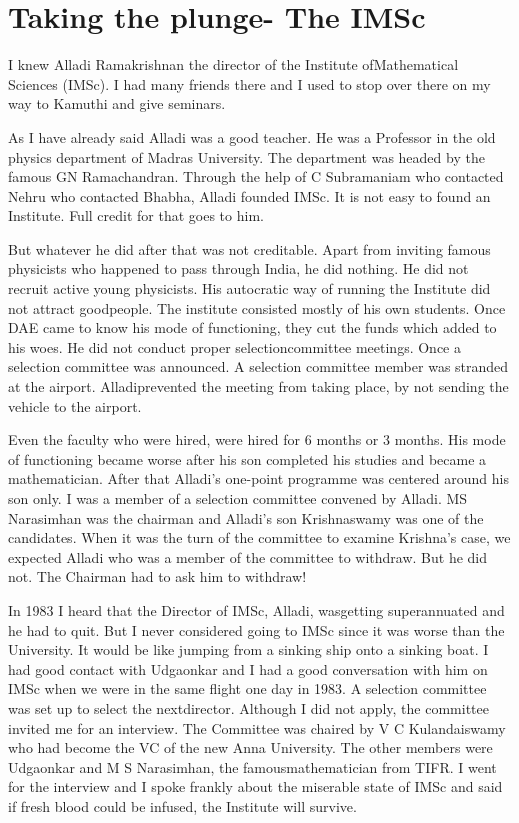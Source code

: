 \chapter{Taking the plunge- The IMSc}

I knew Alladi Ramakrishnan the director of the Institute of\break Mathematical 
Sciences (IMSc). I had many friends there and I used to stop over there 
on my way to Kamuthi and give seminars.


As I have already said Alladi was a good teacher. He was a Professor in 
the old physics department of Madras University. The department was 
headed by the famous GN Ramachandran. Through the help of C Subramaniam 
who contacted Nehru who contacted Bhabha, Alladi founded IMSc. It is not 
easy to found an Institute. Full credit for that goes to him.


But whatever he did after that was not creditable. Apart from inviting 
famous physicists who happened to pass through India, he did nothing. He 
did not recruit active young physicists. His autocratic way of running 
the Institute did not attract good\break people. The institute consisted 
mostly of his own students. Once DAE came to know his mode of 
functioning, they cut the funds which added to his woes. He did not 
conduct proper selection\break committee meetings. Once a selection committee 
was announced. A selection committee member was stranded at the airport. 
Alladi\break prevented the meeting from taking place, by not sending the\break 
vehicle to the airport.

Even the faculty who were hired, were hired for 6 months or 3 months. 
His mode of functioning became worse after his son completed his studies 
and became a mathematician. After that Alladi's one-point programme was 
centered around his son only. I was a member of a selection committee 
convened by Alladi. MS Narasimhan was the chairman and Alladi's son 
Krishnaswamy was one of the candidates. When it was the turn of the 
committee to examine Krishna's case, we expected Alladi who was a member 
of the committee to withdraw. But he did not. The Chairman had to ask 
him to withdraw!
\newpage

In 1983 I heard that the Director of IMSc, Alladi, was\break getting 
superannuated and he had to quit. But I never consi\-dered going to IMSc 
since it was worse than the University. It would be like jumping from a 
sinking ship onto a sinking boat. I had good contact with Udgaonkar and 
I had a good conversa\-tion with him on IMSc when we were in the same 
flight one day in 1983. A selection committee was set up to select the 
next\break director. Although I did not apply, the committee invited me for an 
interview. The Committee was chaired by V C Kulandaiswamy who had become 
the VC of the new Anna University. The other members were Udgaonkar and 
M S Narasimhan, the famous\break mathematician from TIFR. I went for the 
interview and I spoke frankly about the miserable state of IMSc and said 
if fresh blood could be infused, the Institute will survive.

